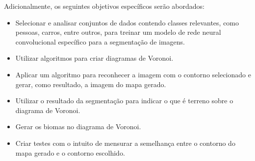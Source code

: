 Adicionalmente, os seguintes objetivos específicos serão abordados:

\begin{itemize}
	\item Selecionar e analisar conjuntos de dados contendo classes relevantes, como pessoas, carros, entre outros, para treinar um modelo de rede neural convolucional específico para a segmentação de imagens.
	\item Utilizar algoritmos para criar diagramas de Voronoi.
	\item Aplicar um algoritmo para reconhecer a imagem com o contorno selecionado e gerar, como resultado, a imagem do mapa gerado.
	\item Utilizar o resultado da segmentação para indicar o que é terreno sobre o diagrama de Voronoi.
	\item Gerar os biomas no diagrama de Voronoi.
	\item Criar testes com o intuito de mensurar a semelhança entre o contorno do mapa gerado e o contorno escolhido.
\end{itemize}